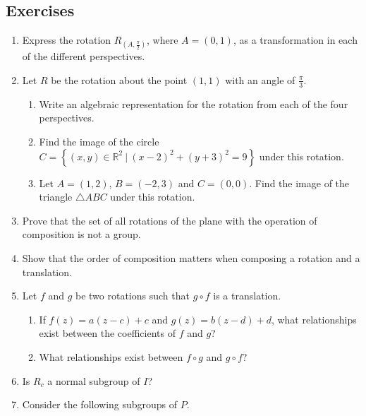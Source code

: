 \documentclass[
]{book}
\providecommand{\tightlist}{%
  \setlength{\itemsep}{0pt}\setlength{\parskip}{0pt}}
\theoremstyle{definition}
\theoremstyle{definition}
\theoremstyle{definition}
\theoremstyle{definition}
\theoremstyle{remark}
\begin{document}
\hypertarget{exercises-53}{%
\subsection{Exercises}\label{exercises-53}}

\begin{enumerate}
\def\labelenumi{\arabic{enumi}.}
\item
  Express the rotation \(R_{(A,\frac{\pi}{2})}\), where \(A=(0,1)\), as a transformation in each of the different perspectives.
\item
  Let \(R\) be the rotation about the point \((1,1)\) with an angle of \(\frac{\pi}{3}\).

  \begin{enumerate}
  \def\labelenumii{\alph{enumii}.}
  \tightlist
  \item
    Write an algebraic representation for the rotation from each of the four perspectives.
  \item
    Find the image of the circle \(C=\left\{ (x,y)\in \mathbb{R}^2 \: \vert \: (x-2)^2+(y+3)^2 =9\right\}\) under this rotation.
  \item
    Let \(A=(1,2)\), \(B=(-2,3)\) and \(C=(0,0)\). Find the image of the triangle \(\triangle ABC\) under this rotation.
  \end{enumerate}
\item
  Prove that the set of all rotations of the plane with the operation of composition is not a group.
\item
  Show that the order of composition matters when composing a rotation and a translation.
\item
  Let \(f\) and \(g\) be two rotations such that \(g\circ f\) is a translation.

  \begin{enumerate}
  \def\labelenumii{\alph{enumii}.}
  \tightlist
  \item
    If \(f(z)=a(z-c)+c\) and \(g(z)=b(z-d)+d\), what relationships exist between the coefficients of \(f\) and \(g\)?
  \item
    What relationships exist between \(f\circ g\) and \(g\circ f\)?
  \end{enumerate}
\item
  Is \(R_c\) a normal subgroup of \(I\)?
\item
  Consider the following subgroups of \(P\).


\end{enumerate}
\end{document}
